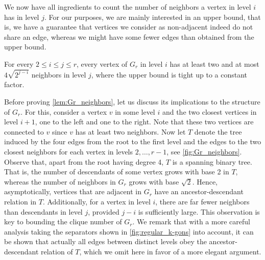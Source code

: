 \documentclass[a4paper,english,cleveref,thm-restate]{lipics-v2021}
\begin{document}
We now have all ingredients to count the number of neighbors a vertex in level $ i $ has in level $ j $.
For our purposes, we are mainly interested in an upper bound, that is, we have a guarantee that vertices we consider as non-adjacent indeed do not share an edge, whereas we might have some fewer edges than obtained from the upper bound.

\begin{lemma}\label{lem:Gr_neighbors}
    For every $ 2 \leq i \leq j \leq r $, every vertex of $ G_r $ in level $ i $ has at least two and at most $ 4 \sqrt{2^{j-i}} $ neighbors in level $ j $, 
    where the upper bound is tight up to a constant factor.
\end{lemma}

Before proving \cref{lem:Gr_neighbors}, let us discuss its implications to the structure of $ G_r $.
For this, consider a vertex $ v $ in some level $ i $ and the two closest vertices in level $ i + 1 $, one to the left and one to the right.
Note that these two vertices are connected to $ v $ since $ v $ has at least two neighbors.
Now let $ T $ denote the tree induced by the four edges from the root to the first level and the edges to the two closest neighbors for each vertex in levels $ 2, \dots, r - 1 $, see \cref{fig:Gr_neighbors}.
Observe that, apart from the root having degree 4, $ T $ is a spanning binary tree.
That is, the number of descendants of some vertex grows with base 2 in $ T $, whereas the number of neighbors in $ G_r $ grows with base $ \sqrt{2} $.
Hence, asymptotically, vertices that are adjacent in $ G_r $ have an ancestor-descendant relation in $ T $.
Additionally, for a vertex in level $ i $, there are far fewer neighbors than descendants in level $ j $, provided $ j - i $ is sufficiently large.
This observation is key to bounding the clique number of $ G_r $.
%
We remark that with a more careful analysis taking the separators shown in \cref{fig:regular_k-gons} into account, it can be shown that actually all edges between distinct levels obey the ancestor-descendant relation of $ T $, which we omit here in favor of a more elegant argument.
\end{document}
